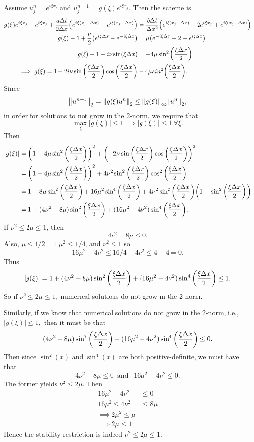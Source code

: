 \documentclass[12pt]{article}
\begin{document}
\begin{enumerate}[(a)]
Assume $u_j^n = e^{i\xi x_j}$ and $u_j^{n=1} = g(\xi) e^{i \xi x_j}$.  Then the scheme is 
\begin{align*}
g(\xi)e^{i \xi x_j}-e^{i \xi x_j} + \dfrac{a\Delta t}{2 \Delta x} \qty(e^{i \xi (x_j+\Delta x)} - e^{i \xi (x_j-\Delta x)}) &= \dfrac{b\Delta t}{\Delta x^2} \qty(e^{i \xi (x_j-\Delta x)}-2e^{i \xi x_j}+e^{i \xi (x_j+\Delta x)}) \\
g(\xi)-1 + \dfrac{\nu}{2}\qty(e^{i \xi \Delta x}-e^{-i \xi \Delta x}) &= \mu \qty(e^{-i\xi \Delta x}-2+e^{i\xi\Delta x})\\
g(\xi)- 1 + i \nu \sin(\xi\Delta x) &= -4\mu \sin^2\qty(\dfrac{\xi \Delta x}{2}) \\
\implies g(\xi) = 1 - 2i \nu \sin\qty(\dfrac{\xi \Delta x}{2}) \cos\qty(\dfrac{\xi \Delta x}{2})  &- 4\mu sin^2\qty(\dfrac{\xi\Delta x}{2}).
\end{align*}
Since 
$$\norm{u^{n+1}}_2 = \norm{g(\xi)u^n}_2 \leq \norm{g(\xi)}_\infty \norm{u^n}_2,$$
in order for solutions to not grow in the 2-norm, we require that
$$\max_{\xi} |g(\xi)| \leq 1 \implies |g(\xi)|\leq 1 \ \forall \xi.$$
Then 
\begin{align*}
|g(\xi)| &= \qty(1-4\mu\sin^2\qty(\dfrac{\xi \Delta x}{2}))^2 + \qty(-2\nu \sin\qty(\dfrac{\xi \Delta x}{2})\cos\qty(\dfrac{\xi \Delta x}{2}))^2 \\
&= \qty(1-4\mu\sin^2\qty(\dfrac{\xi \Delta x}{2}))^2 + 4\nu^2 \sin^2\qty(\dfrac{\xi \Delta x}{2})\cos^2\qty(\dfrac{\xi \Delta x}{2}) \\
&= 1-8\mu\sin^2\qty(\dfrac{\xi \Delta x}{2})+16\mu^2\sin^4\qty(\dfrac{\xi \Delta x}{2}) + 4\nu^2 \sin^2\qty(\dfrac{\xi \Delta x}{2})\qty(1-\sin^2\qty(\dfrac{\xi \Delta x}{2})) \\
&= 1+(4\nu^2-8\mu)\sin^2\qty(\dfrac{\xi \Delta x}{2})+(16\mu^2-4\nu^2)\sin^4\qty(\dfrac{\xi \Delta x}{2}).
\end{align*}
If $\nu^2 \leq 2\mu \leq 1$, then $$4\nu^2 - 8\mu\leq 0.$$
Also, $\mu\leq 1/2 \implies \mu^2\leq 1/4$, and $\nu^2\leq 1$ so 
$$16\mu^2 -4\nu^2 \leq 16/4 - 4\nu^2 \leq 4-4 = 0.$$
Thus $$|g(\xi)| =  1+(4\nu^2-8\mu)\sin^2\qty(\dfrac{\xi \Delta x}{2})+(16\mu^2-4\nu^2)\sin^4\qty(\dfrac{\xi \Delta x}{2}) \leq 1.$$
So if $\nu^2 \leq 2\mu \leq 1,$ numerical solutions do not grow in the 2-norm.

Similarly, if we know that numerical solutions do not grow in the 2-norm, i.e.,
$|g(\xi)| \leq 1,$
then it must be that $$(4\nu^2-8\mu)\sin^2\qty(\dfrac{\xi \Delta x}{2})+(16\mu^2-4\nu^2)\sin^4\qty(\dfrac{\xi \Delta x}{2}) \leq 0.$$
Then since $\sin^2(x)$ and $\sin^4(x)$ are both positive-definite, we must have that $$4\nu^2-8\mu \leq 0  \ \text{ and }\ \ 16\mu^2 - 4\nu^2 \leq 0 .$$
The former yields $\nu^2 \leq 2 \mu$.  Then
\begin{align*}
16\mu^2 - 4 \nu^2 &\leq 0 \\
16\mu^2 \leq 4\nu^2 &\leq 8 \mu \\
\implies 2\mu^2 \leq \mu \\
\implies 2\mu \leq 1.
\end{align*}
Hence the stability restriction is indeed $\nu^2 \leq 2\mu \leq 1.$


\end{enumerate}
\end{document}
